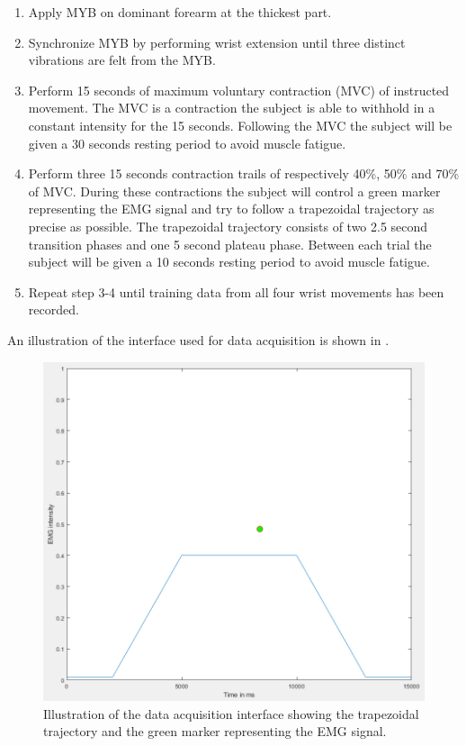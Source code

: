 \begin{enumerate}
	\item Apply MYB on dominant forearm at the thickest part.
	\item Synchronize MYB by performing wrist extension until three distinct vibrations are felt from the MYB.
	\item Perform 15 seconds of maximum voluntary contraction (MVC) of instructed movement. The MVC is a contraction the subject is able to withhold in a constant intensity for the 15 seconds. Following the MVC the subject will be given a 30 seconds resting period to avoid muscle fatigue.
	\item Perform three 15 seconds contraction trails of respectively 40\%, 50\% and 70\% of MVC. During these contractions the subject will control a green marker representing the EMG signal and try to follow a trapezoidal trajectory as precise as possible. The trapezoidal trajectory consists of two 2.5 second transition phases and one 5 second plateau phase. Between each trial the subject will be given a 10 seconds resting period to avoid muscle fatigue.
	\item Repeat step 3-4 until training data from all four wrist movements has been recorded.
\end{enumerate}

An illustration of the interface used for data acquisition is shown in .

\begin{figure}[H]                 
	\includegraphics[width=.8\textwidth]{figures/xBackground/dataacqGUI2}  
	\caption{Illustration of the data acquisition interface showing the trapezoidal trajectory and the green marker representing the EMG signal.}
	\label{fig:dataacqGUI} 
\end{figure}

